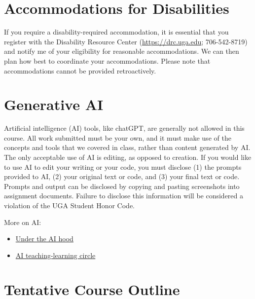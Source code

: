 \documentclass[12pt]{article}
\begin{document}
\section*{\normalsize Accommodations for Disabilities}
\vspace{-4mm}

If you require a disability-required accommodation, it is essential
that you register with the Disability Resource Center
(\url{https://drc.uga.edu}; 706-542-8719) 
and notify me of your eligibility for reasonable accommodations. We
can then plan how best to coordinate your accommodations. Please note
that accommodations cannot be provided retroactively.



\section*{\normalsize Generative AI}
\vspace{-4mm}


Artificial intelligence (AI) tools, like chatGPT, are generally not
allowed in this course. All work submitted must be your own, and it
must make use of the concepts and tools that we covered in class,
rather than content generated by AI. The only acceptable use of AI is
editing, as opposed to creation. If you would like to use AI to edit
your writing or your code, you must disclose (1) the prompts provided
to AI, (2) your original text or code, and (3) your final text or
code. Prompts and output can be disclosed by copying and pasting
screenshots into assignment documents. Failure to disclose this
information will be considered a violation of the UGA Student Honor
Code. 

More on AI:

\begin{itemize}
  \item \href{https://thebullshitmachines.com/}{Under the AI hood}
  \item \href{https://drive.google.com/file/d/1AN9GrksC4kLIE57fuS4zg8nPsyYtNEmr/view?usp=sharing}{AI
    teaching-learning circle}
\end{itemize}
\clearpage

\section*{\normalsize Tentative Course Outline}
\end{document}
